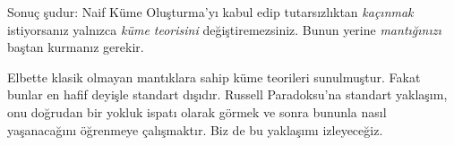 \documentclass[../../../include/open-logic-section]{subfiles}
\begin{document}
Sonuç şudur: Naif Küme Oluşturma'yı kabul edip tutarsızlıktan
\emph{kaçınmak} istiyorsanız yalnızca \emph{küme teorisini} değiştiremezsiniz.
Bunun yerine \emph{mantığınızı} baştan kurmanız gerekir.

Elbette klasik olmayan mantıklara sahip küme teorileri sunulmuştur. Fakat
bunlar en hafif deyişle standart dışıdır. Russell Paradoksu'na standart
yaklaşım, onu doğrudan bir yokluk ispatı olarak görmek ve sonra bununla nasıl
yaşanacağını öğrenmeye çalışmaktır. Biz de bu yaklaşımı izleyeceğiz.
\end{document}

